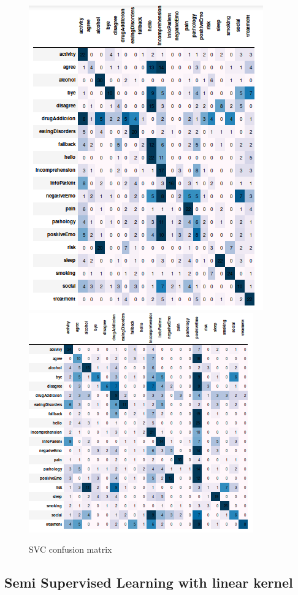 \documentclass[11pt]{article}
\begin{document}
\begin{figure}[h]
	\centering
	\includegraphics[scale=0.40]{svc0_cm.png}
	\includegraphics[scale=0.40]{lsvc_0.png}
	\caption{SVC confusion matrix}
\label{lda_gm_cm}
\end{figure}
\FloatBarrier


\subsection{Semi Supervised Learning with linear kernel}
\end{document}
